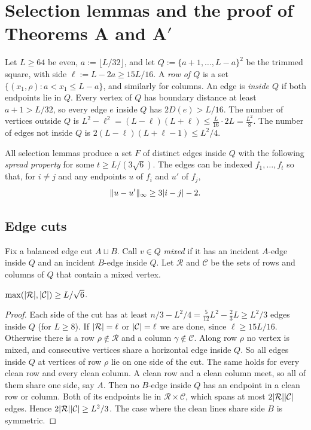 \section{Selection lemmas and the proof of Theorems A and A$'$}\label{sec:selection}

Let $L\ge64$ be even, $a:=\lfloor L/32\rfloor$, and let $Q:=\{a+1,\dots,L-a\}^2$ be the trimmed square, with side $\ell:=L-2a\ge15L/16$. A \emph{row of $Q$} is a set $\{(x_1,\rho):a<x_1\le L-a\}$, and similarly for columns. An edge is \emph{inside $Q$} if both endpoints lie in $Q$. Every vertex of $Q$ has boundary distance at least $a+1>L/32$, so every edge $e$ inside $Q$ has $2D(e)>L/16$. The number of vertices outside $Q$ is $L^2-\ell^2=(L-\ell)(L+\ell)\le\frac{L}{16}\cdot2L=\frac{L^2}8$. The number of edges not inside $Q$ is $2(L-\ell)(L+\ell-1)\le L^2/4$.

All selection lemmas produce a set $F$ of distinct edges inside $Q$ with the following \emph{spread property} for some $t\ge L/(3\sqrt6)$. The edges can be indexed $f_1,\dots,f_t$ so that, for $i\ne j$ and any endpoints $u$ of $f_i$ and $u'$ of $f_j$,
\begin{equation}\label{eq:spread}
  \lVert u-u'\rVert_\infty\ge3\lvert i-j\rvert-2 .
\end{equation}

\subsection{Edge cuts}

Fix a balanced edge cut $A\sqcup B$. Call $v\in Q$ \emph{mixed} if it has an incident $A$-edge inside $Q$ and an incident $B$-edge inside $Q$. Let $\mathcal R$ and $\mathcal C$ be the sets of rows and columns of $Q$ that contain a mixed vertex.

\begin{lemma}\label{lem:mixed-edge}
$\max(\lvert \mathcal R\rvert,\lvert \mathcal C\rvert)\ge L/\sqrt6$.
\end{lemma}

\begin{proof}
Each side of the cut has at least $n/3-L^2/4=\frac5{12}L^2-\frac23L\ge L^2/3$ edges inside $Q$ (for $L\ge8$). If $\lvert \mathcal R\rvert=\ell$ or $\lvert \mathcal C\rvert=\ell$ we are done, since $\ell\ge15L/16$. Otherwise there is a row $\rho\notin\mathcal R$ and a column $\gamma\notin\mathcal C$. Along row $\rho$ no vertex is mixed, and consecutive vertices share a horizontal edge inside $Q$. So all edges inside $Q$ at vertices of row $\rho$ lie on one side of the cut. The same holds for every clean row and every clean column. A clean row and a clean column meet, so all of them share one side, say $A$. Then no $B$-edge inside $Q$ has an endpoint in a clean row or column. Both of its endpoints lie in $\mathcal R\times\mathcal C$, which spans at most $2\lvert \mathcal R\rvert\lvert \mathcal C\rvert$ edges. Hence $2\lvert \mathcal R\rvert\lvert \mathcal C\rvert\ge L^2/3$. The case where the clean lines share side $B$ is symmetric.
\end{proof}

